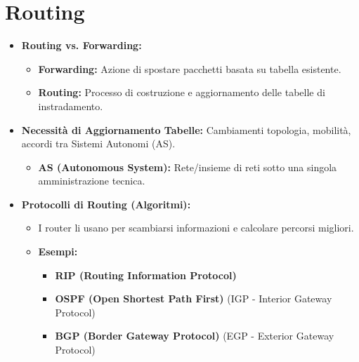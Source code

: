 \documentclass{article}
\begin{document}
\section{Routing}
\begin{itemize}
    \item \textbf{Routing vs. Forwarding:}
    \begin{itemize}
        \item \textbf{Forwarding:} Azione di spostare pacchetti basata su tabella esistente.
        \item \textbf{Routing:} Processo di costruzione e aggiornamento delle tabelle di instradamento.
    \end{itemize}
    \item \textbf{Necessità di Aggiornamento Tabelle:} Cambiamenti topologia, mobilità, accordi tra Sistemi Autonomi (AS).
    \begin{itemize}
        \item \textbf{AS (Autonomous System):} Rete/insieme di reti sotto una singola amministrazione tecnica.
    \end{itemize}
    \item \textbf{Protocolli di Routing (Algoritmi):}
    \begin{itemize}
        \item I router li usano per scambiarsi informazioni e calcolare percorsi migliori.
        \item \textbf{Esempi:}
        \begin{itemize}
            \item \textbf{RIP (Routing Information Protocol)}
            \item \textbf{OSPF (Open Shortest Path First)} (IGP - Interior Gateway Protocol)
            \item \textbf{BGP (Border Gateway Protocol)} (EGP - Exterior Gateway Protocol)
        \end{itemize}
    \end{itemize}
\end{itemize}
\end{document}
